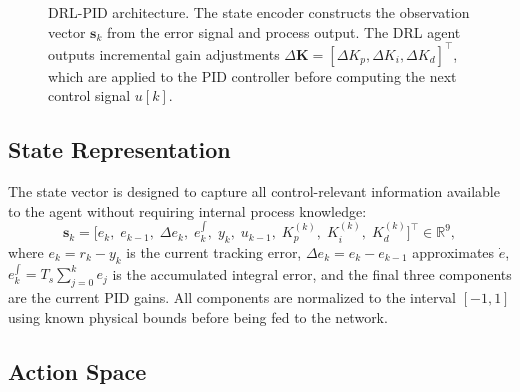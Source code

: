 \documentclass[conference,a4paper]{IEEEtran}[2015/08/26]
\newcommand{\R}{\mathbb{R}}
\newcommand{\vek}[1]{\bm{#1}}
\begin{document}
\begin{figure}[t]
  \caption{DRL-PID architecture. The state encoder constructs the
    observation vector $\vek{s}_k$ from the error signal and process
    output. The DRL agent outputs incremental gain adjustments $\Delta\vek{K}
    = [\Delta K_p, \Delta K_i, \Delta K_d]^\top$, which are applied to
    the PID controller before computing the next control signal $u[k]$.}
  \label{fig:arch}
\end{figure}

\subsection{State Representation}

The state vector is designed to capture all control-relevant information
available to the agent without requiring internal process knowledge:
\begin{equation}
  \vek{s}_k = \bigl[e_k,\; e_{k-1},\; \Delta e_k,\; e_k^{\int},\;
               y_k,\; u_{k-1},\; K_p^{(k)},\; K_i^{(k)},\; K_d^{(k)}\bigr]^\top
              \in \R^9,
  \label{eq:state}
\end{equation}
where $e_k = r_k - y_k$ is the current tracking error,
$\Delta e_k = e_k - e_{k-1}$ approximates $\dot{e}$,
$e_k^{\int} = T_s \sum_{j=0}^{k} e_j$ is the accumulated integral error,
and the final three components are the current PID gains. All
components are normalized to the interval $[-1, 1]$ using known physical
bounds before being fed to the network.

\subsection{Action Space}
\end{document}
